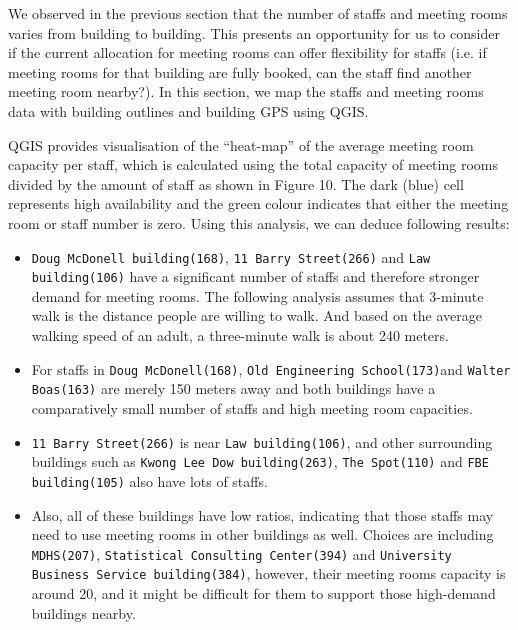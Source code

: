 We observed in the previous section that the number of staffs and meeting rooms varies from building to building. This presents an opportunity for us to consider if the current allocation for meeting rooms can offer flexibility for staffs (i.e. if meeting rooms for that building are fully booked, can the staff find another meeting room nearby?). In this section, we map the staffs and meeting rooms data with building outlines and building GPS using QGIS. 

QGIS provides visualisation of the “heat-map” of the average meeting room capacity per staff, which is calculated using the total capacity of meeting rooms divided by the amount of staff as shown in Figure 10. The dark (blue) cell represents high availability and the green colour indicates that either the meeting room or staff number is zero. Using this analysis, we can deduce following results:

\begin{itemize}
    \item \texttt{Doug McDonell building(168)}, \texttt{11 Barry Street(266)} and \texttt{Law building(106)} have a significant number of staffs and therefore stronger demand for meeting rooms. The following analysis assumes that 3-minute walk is the distance people are willing to walk. And based on the average walking speed of an adult, a three-minute walk is about 240 meters.
    
    \item For staffs in \texttt{Doug McDonell(168)}, \texttt{Old Engineering School(173)}and \texttt{Walter Boas(163)} are merely 150 meters away and both buildings have a comparatively small number of staffs and high meeting room capacities.
    
    \item \texttt{11 Barry Street(266)} is near \texttt{Law building(106)}, and other surrounding buildings such as \texttt{Kwong Lee Dow building(263)}, \texttt{The Spot(110)} and \texttt{FBE building(105)} also have lots of staffs.
    
    \item Also, all of these buildings have low ratios, indicating that those staffs may need to use meeting rooms in other buildings as well.  Choices are including \texttt{MDHS(207)}, \texttt{Statistical Consulting Center(394)} and \texttt{University Business Service building(384)}, however, their meeting rooms capacity is around 20, and it might be difficult for them to support those high-demand buildings nearby.
\end{itemize}
   
